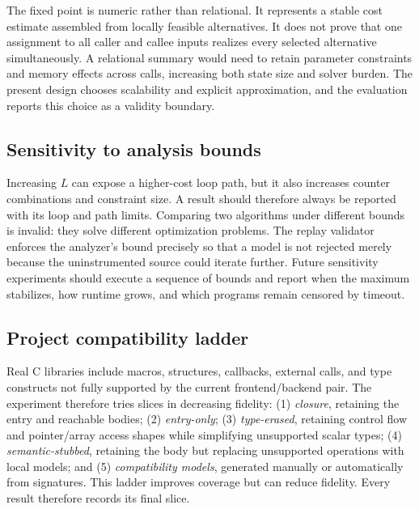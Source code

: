 \documentclass[10pt,conference]{IEEEtran}
\begin{document}
The fixed point is numeric rather than relational. It represents a stable cost estimate assembled from locally feasible alternatives. It does not prove that one assignment to all caller and callee inputs realizes every selected alternative simultaneously. A relational summary would need to retain parameter constraints and memory effects across calls, increasing both state size and solver burden. The present design chooses scalability and explicit approximation, and the evaluation reports this choice as a validity boundary.

\subsection{Sensitivity to analysis bounds}
Increasing $L$ can expose a higher-cost loop path, but it also increases counter combinations and constraint size. A result should therefore always be reported with its loop and path limits. Comparing two algorithms under different bounds is invalid: they solve different optimization problems. The replay validator enforces the analyzer's bound precisely so that a model is not rejected merely because the uninstrumented source could iterate further. Future sensitivity experiments should execute a sequence of bounds and report when the maximum stabilizes, how runtime grows, and which programs remain censored by timeout.

\subsection{Project compatibility ladder}
Real C libraries include macros, structures, callbacks, external calls, and type constructs not fully supported by the current frontend/backend pair. The experiment therefore tries slices in decreasing fidelity: (1) \emph{closure}, retaining the entry and reachable bodies; (2) \emph{entry-only}; (3) \emph{type-erased}, retaining control flow and pointer/array access shapes while simplifying unsupported scalar types; (4) \emph{semantic-stubbed}, retaining the body but replacing unsupported operations with local models; and (5) \emph{compatibility models}, generated manually or automatically from signatures. This ladder improves coverage but can reduce fidelity. Every result therefore records its final slice.
\end{document}
